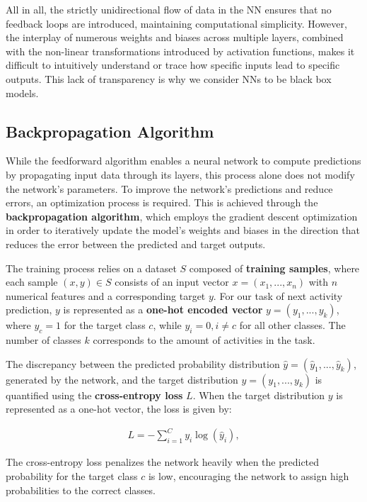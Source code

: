 All in all, the strictly unidirectional flow of data in the NN
ensures that no feedback loops are introduced, maintaining computational simplicity.
However, the interplay of numerous weights and biases across multiple layers,
combined with the non-linear transformations introduced by activation functions,
makes it difficult to intuitively understand or trace how specific inputs lead to specific outputs.
This lack of transparency is why we consider NNs to be black box models.

\subsection{Backpropagation Algorithm}
\label{sec:backpropagation}
While the feedforward algorithm enables a neural network to compute predictions
by propagating input data through its layers,
this process alone does not modify the network's parameters.
To improve the network's predictions and reduce errors,
an optimization process is required.
This is achieved through the \textbf{backpropagation algorithm},
which employs the gradient descent optimization in order to
iteratively update the model's weights and biases in the direction that reduces the error
between the predicted and target outputs.

The training process relies on a dataset $S$ composed of \textbf{training samples},
where each sample $(x,y) \in S$ consists of an input vector $x=(x_1,...,x_n)$ with $n$ numerical features
and a corresponding target $y$.
For our task of next activity prediction,
$y$ is represented as a \textbf{one-hot encoded vector} $y = (y_1, ..., y_k)$,
where $y_c = 1$ for the target class $c$, while $y_i = 0, i \neq c$ for all other classes.
The number of classes $k$ corresponds to the amount of activities in the task.

The discrepancy between the predicted probability distribution $\hat{y} = (\hat{y}_1, ..., \hat{y}_k)$,
generated by the network, and the target distribution $y = (y_1, ..., y_k)$
is quantified using the \textbf{cross-entropy loss} $L$.
When the target distribution $y$ is represented as a one-hot vector, the loss is given by:

\begin{align} L = - \sum_{i=1}^C y_i \log(\hat{y}_i), \end{align}

The cross-entropy loss penalizes the network heavily when the predicted probability for the target class $c$ is low,
encouraging the network to assign high probabilities to the correct classes.


